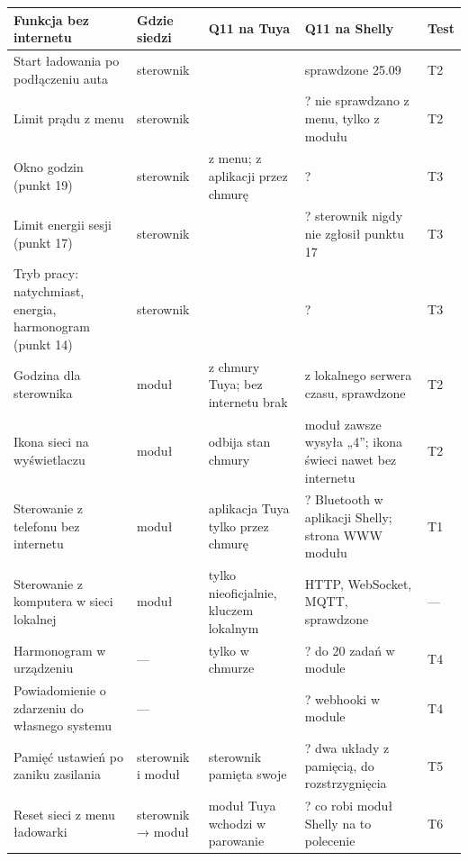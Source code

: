 \documentclass[11pt,a4paper]{article}
\begin{document}
\begin{longtable}{>{\raggedright\arraybackslash}p{4.56cm}>{\raggedright\arraybackslash}p{1.82cm}>{\raggedright\arraybackslash}p{2.74cm}>{\raggedright\arraybackslash}p{4.33cm}>{\raggedright\arraybackslash}p{0.95cm}}
\toprule
\rowcolor{apteallight}\textbf{Funkcja bez internetu} & \textbf{Gdzie siedzi} & \textbf{Q11 na Tuya} & \textbf{Q11 na Shelly} & \textbf{Test} \\
\midrule\endhead
\bottomrule\endfoot
Start ładowania po podłączeniu auta & sterownik & \leavevmode{\symbolfont\color{apgreen}\textbf{✔}} & \leavevmode{\symbolfont\color{apgreen}\textbf{✔}} sprawdzone 25.09 & T2 \\
Limit prądu z menu & sterownik & \leavevmode{\symbolfont\color{apgreen}\textbf{✔}} & ? nie sprawdzano z menu, tylko z modułu & T2 \\
Okno godzin (punkt 19) & sterownik & \leavevmode{\symbolfont\color{apgreen}\textbf{✔}} z menu; z aplikacji przez chmurę & ? & T3 \\
Limit energii sesji (punkt 17) & sterownik & \leavevmode{\symbolfont\color{apgreen}\textbf{✔}} & ? sterownik nigdy nie zgłosił punktu 17 & T3 \\
Tryb pracy: natychmiast, energia, harmonogram (punkt 14) & sterownik & \leavevmode{\symbolfont\color{apgreen}\textbf{✔}} & ? & T3 \\
Godzina dla sterownika & moduł & z chmury Tuya; bez internetu brak & \leavevmode{\symbolfont\color{apgreen}\textbf{✔}} z lokalnego serwera czasu, sprawdzone & T2 \\
Ikona sieci na wyświetlaczu & moduł & odbija stan chmury & \leavevmode{\symbolfont\color{apgreen}\textbf{✔}} moduł zawsze wysyła „4”; ikona świeci nawet bez internetu & T2 \\
Sterowanie z telefonu bez internetu & moduł & \leavevmode{\symbolfont\color{apred}\textbf{✘}} aplikacja Tuya tylko przez chmurę & ? Bluetooth w aplikacji Shelly; strona WWW modułu & T1 \\
Sterowanie z komputera w sieci lokalnej & moduł & \leavevmode{\symbolfont\color{apamber}\textbf{◐}} tylko nieoficjalnie, kluczem lokalnym & \leavevmode{\symbolfont\color{apgreen}\textbf{✔}} HTTP, WebSocket, MQTT, sprawdzone & — \\
Harmonogram w urządzeniu & — & \leavevmode{\symbolfont\color{apred}\textbf{✘}} tylko w chmurze & ? do 20 zadań w module & T4 \\
Powiadomienie o zdarzeniu do własnego systemu & — & \leavevmode{\symbolfont\color{apred}\textbf{✘}} & ? webhooki w module & T4 \\
Pamięć ustawień po zaniku zasilania & sterownik i moduł & sterownik pamięta swoje & ? dwa układy z pamięcią, do rozstrzygnięcia & T5 \\
Reset sieci z menu ładowarki & sterownik {\symbolfont→} moduł & \leavevmode{\symbolfont\color{apgreen}\textbf{✔}} moduł Tuya wchodzi w parowanie & ? co robi moduł Shelly na to polecenie & T6 \\
\end{longtable}
\end{document}
